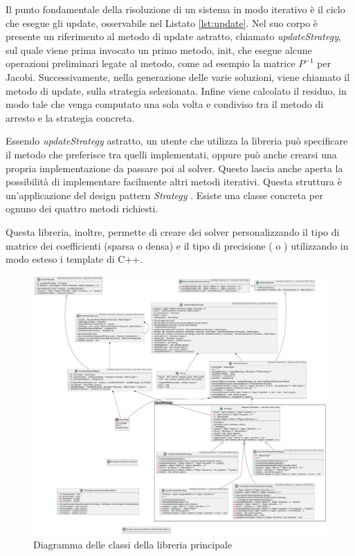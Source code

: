 Il punto fondamentale della risoluzione di un sistema in modo iterativo è il ciclo che esegue gli update, osservabile nel Listato \ref{lst:update}. Nel suo corpo è presente un riferimento al metodo di update astratto, chiamato \textit{updateStrategy}, sul quale viene prima invocato un primo metodo, init, che esegue alcune operazioni preliminari legate al metodo, come ad esempio la matrice $P^{-1}$ per Jacobi. Successivamente, nella generazione delle varie soluzioni, viene chiamato il metodo di update, sulla strategia selezionata. Infine viene calcolato il residuo, in modo tale che venga computato una sola volta e condiviso tra il metodo di arresto e la strategia concreta.

Essendo \textit{updateStrategy} astratto, un utente che utilizza la libreria può specificare il metodo che preferisce tra quelli implementati, oppure può anche crearsi una propria implementazione da passare poi al solver. Questo lascia anche aperta la possibilità di implementare facilmente altri metodi iterativi. Questa struttura è un'applicazione del design pattern \textit{Strategy} \cite{Strategy}. Esiste una classe concreta per ognuno dei quattro metodi richiesti.




Questa libreria, inoltre, permette di creare dei solver personalizzando il tipo di matrice dei coefficienti (sparsa o densa) e il tipo di precisione ( o ) utilizzando in modo esteso i template di C++.

\begin{figure}
	\centering
	\includegraphics[width=\textwidth]{figures/libDiagram.pdf}
	\caption{Diagramma delle classi della libreria principale}
	\label{fig:libdiagram}
\end{figure}


